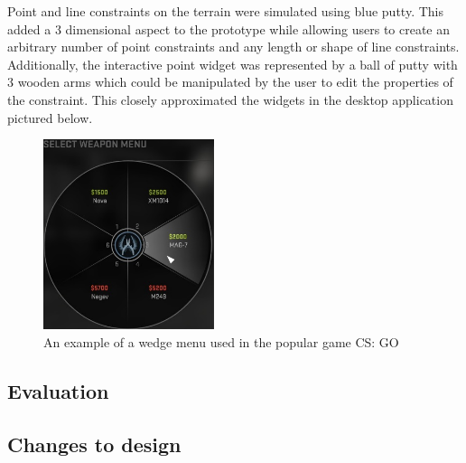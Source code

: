\documentclass{sig-alternate-05-2015}
\begin{document}
Point and line constraints on the terrain were simulated using blue putty. This added a 3 dimensional aspect to the prototype while allowing users to create an arbitrary number of point constraints and any length or shape of line constraints. Additionally, the interactive point widget was represented by a ball of putty with 3 wooden arms which could be manipulated by the user to edit the properties of the constraint. This closely approximated the widgets in the desktop application pictured below.

\begin{figure}[H]
	\centering
	\includegraphics[width=5cm]{WedgeMenu}
	\caption{An example of a wedge menu used in the popular game CS: GO}
\end{figure}

\subsection{Evaluation}
\subsection{Changes to design}


\end{document}
